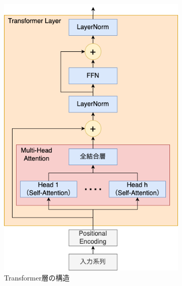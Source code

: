 \documentclass[12pt]{jarticle}
\numberwithin{equation}{section}    %
\numberwithin{figure}{section}      %
\numberwithin{table}{section}      %
\begin{document}
\begin{figure}[bt]
    \centering
    \includegraphics[height=140mm]{./figure/sec3/transformer.drawio.png}
    \caption{Transformer層の構造}
    \label{sec3:fig:transformer_layer}
\end{figure}
\end{document}
